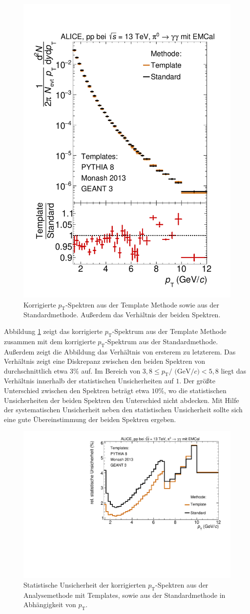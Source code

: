 \begin{figure}[t!]
\centering
\includegraphics[width=.65\linewidth]{KorrigierteYields_Data_2016.pdf}
\caption{Korrigierte $p_\text{T}$-Spektren aus der Template Methode sowie aus der Standardmethode.
Außerdem das Verhältnis der beiden Spektren.}
\label{fig:KorrYieldComp}
\end{figure}
Abbildung \ref{fig:KorrYieldComp} zeigt das korrigierte $p_\text{T}$-Spektrum aus der Template Methode zusammen mit dem korrigierte $p_\text{T}$-Spektrum aus der Standardmethode.
Außerdem zeigt die Abbildung das Verhältnis von ersterem zu letzterem.
Das Verhältnis zeigt eine Diskrepanz zwischen den beiden Spektren von durchschnittlich etwa $3\%$ auf.
Im Bereich von $3,8 \leq p_\text{T}/\text{ (GeV}/c) < 5,8$ liegt das Verhältnis innerhalb der statistischen Unsicherheiten auf $1$.
Der größte Unterschied zwischen den Spektren beträgt etwa $10\%$, wo die statistischen Unsicherheiten der beiden Spektren den Unterschied nicht abdecken.
Mit Hilfe der systematischen Unsicherheit neben den statistischen Unsicherheit sollte sich eine gute Übereinstimmung der beiden Spektren ergeben.
\begin{figure}[t!]
\centering
\includegraphics[width=.65\linewidth]{StatistischeUnsicherheitVergleich_Data_2016.pdf}
\caption{Statistische Unsicherheit der korrigierten $p_\text{T}$-Spektren aus der Analysemethode mit Templates, sowie aus der Standardmethode in Abhängigkeit von $p_\text{T}$.}
\label{fig:StatUncer}
\end{figure}
